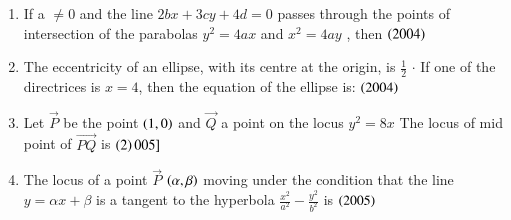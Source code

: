 \documentclass[journal,12pt,twocolumn]{IEEEtran}
\theoremstyle{remark}
\begin{document}
\begin{enumerate}
\begin{enumerate}[label=(\alph*)]
\end{enumerate}
\hfill
\item If a $ \neq 0 $ and the line {$ 2bx +3cy + 4d = 0 $} passes through the points of intersection of the parabolas {$ y^2 = 4ax $} and {$  x^2 = 4ay $} , then 
\hfill
\hfill{{$\left(2004\right) $}}
\begin{enumerate}[label=(\alph*)]
\end{enumerate}
\hfill
\item The eccentricity of an ellipse, with its centre at the origin, is {$ \frac{1}{2} $} {$ \cdot $} If one of the directrices is {$ x = 4 $}, then the equation of the ellipse is: \hfill{{$ \left(2004\right) $}}
\begin{enumerate}[label=(\alph*)]
\end{enumerate}
\hfill 
\item Let {$\vec{P}$} be the point {$ \left(1,0\right) $} and {$\vec{Q}$} a point on the locus {$ y^2 = 8x $} The locus of mid point of {$\vec{PQ}$} is \hfill{{$ \left(2\right)005] $}}
\begin{enumerate}[label=(\alph*)]
\end{enumerate}
\hfill
\item The locus of a point {$\vec{P}$} {$ \left(\alpha,\beta\right) $} moving under the condition that the line {$ y = \alpha x + \beta $} is a tangent to the hyperbola {$ \frac{x^2}{a^2} - \frac{y^2}{b^2} $} is \hfill{{$ \left(2005\right) $}}

\end{enumerate}
\end{document}
